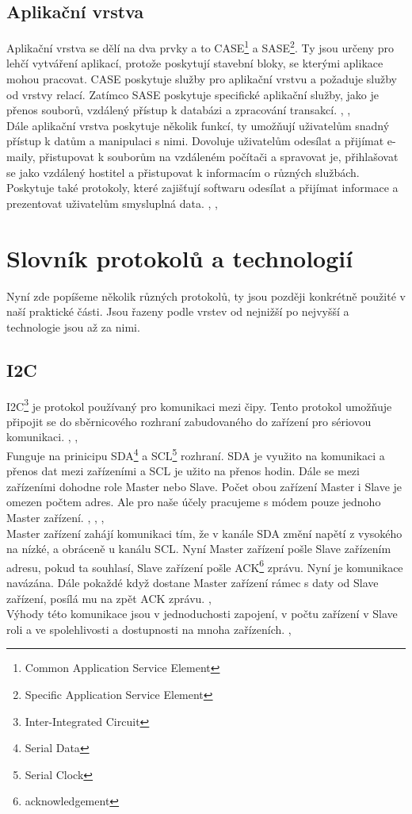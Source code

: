 \documentclass[12pt]{report}			%
\begin{document}
				\subsection{Aplikační vrstva}
Aplikační vrstva se dělí na dva prvky a to CASE\footnote{Common Application Service Element} a SASE\footnote{Specific Application Service Element}. Ty jsou určeny pro lehčí vytváření aplikací, protože poskytují stavební bloky, se kterými aplikace mohou pracovat. CASE poskytuje služby pro aplikační vrstvu a požaduje služby od vrstvy relací. Zatímco SASE poskytuje specifické aplikační služby, jako je přenos souborů, vzdálený přístup k databázi a zpracování transakcí. \cite{aplication1}, \cite{aplication2}, \cite{aplication3}
\\
Dále aplikační vrstva poskytuje několik funkcí, ty umožňují uživatelům snadný přístup k datům a manipulaci s nimi. Dovoluje uživatelům odesílat a přijímat e-maily, přistupovat k souborům na vzdáleném počítači a spravovat je, přihlašovat se jako vzdálený hostitel a přistupovat k informacím o různých službách. Poskytuje také protokoly, které zajišťují softwaru odesílat a přijímat informace a prezentovat uživatelům smysluplná data. \cite{aplication1}, \cite{aplication2}, \cite{aplication3}


			\section{Slovník protokolů a technologií}
			
			
Nyní zde popíšeme několik různých protokolů, ty jsou později konkrétně použité v naší praktické části. Jsou řazeny podle vrstev od nejnižší po nejvyšší a technologie jsou až za nimi.


				\subsection{I2C}
				
				
I2C\footnote{Inter-Integrated Circuit} je protokol používaný pro komunikaci mezi čipy. Tento protokol umožňuje připojit se do sběrnicového rozhraní zabudovaného do zařízení pro sériovou komunikaci. \cite{i2c4}, \cite{i2c1}, \cite{i2c3}
\\
Funguje na prinicipu SDA\footnote{Serial Data} a SCL\footnote{Serial Clock} rozhraní. SDA je využito na komunikaci a přenos dat mezi zařízeními a SCL je užito na přenos hodin. Dále se mezi zařízeními dohodne role Master nebo Slave. Počet obou zařízení Master i Slave je omezen počtem adres. Ale pro naše účely pracujeme s módem pouze jednoho Master zařízení. \cite{i2c4}, \cite{i2c1}, \cite{i2c3}, \cite{i2c4}
\\
 Master zařízení zahájí komunikaci tím, že v kanále SDA změní napětí z vysokého na nízké, a obráceně u kanálu SCL. Nyní Master zařízení pošle Slave zařízením adresu, pokud ta souhlasí, Slave zařízení pošle ACK\footnote{acknowledgement} zprávu. Nyní je komunikace navázána. Dále pokaždé když dostane Master zařízení rámec s daty od Slave zařízení, posílá mu na zpět ACK zprávu. \cite{i2c4}, \cite{i2c3}
\\
Výhody této komunikace jsou v jednoduchosti zapojení, v počtu zařízení v Slave roli a ve spolehlivosti a dostupnosti na mnoha zařízeních.  \cite{i2c1}, \cite{i2c4}
\end{document}
